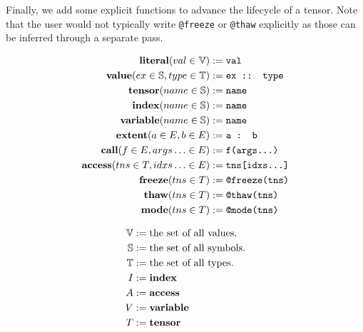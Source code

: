 Finally, we add some explicit functions to advance the lifecycle of a tensor.
Note that the user would not typically write \texttt{@freeze} or
\texttt{@thaw} explicitly as those can be inferred through a separate
pass.

\begin{figure}
\scriptsize
\noindent %
\begin{minipage}{0.4\linewidth}
\begin{align*}
    \text{\textbf{literal}}(val \in \mathbb{V}) &:= \text{\texttt{val}} \\
    \text{\textbf{value}}(ex \in \mathbb{S}, type \in \mathbb{T}) &:= \text{\texttt{ex :: type}} \\
    \text{\textbf{tensor}}(name \in \mathbb{S}) &:= \text{\texttt{name}} \\
    \text{\textbf{index}}(name \in \mathbb{S}) &:= \text{\texttt{name}} \\
    \text{\textbf{variable}}(name \in \mathbb{S}) &:= \text{\texttt{name}} \\
    \text{\textbf{extent}}(a \in E, b \in E) &:= \text{\texttt{a : b}} \\
    \text{\textbf{call}}(f \in E, args\ldots \in E) &:= \text{\texttt{f(args...)}} \\
    \text{\textbf{access}}(tns \in T, idxs\ldots \in E) &:= \text{\texttt{tns[idxs...]}} \\
    \text{\textbf{freeze}}(tns \in T) &:= \text{\texttt{@freeze(tns)}} \\
    \text{\textbf{thaw}}(tns \in T) &:= \text{\texttt{@thaw(tns)}} \\
    \text{\textbf{mode}}(tns \in T) &:= \text{\texttt{@mode(tns)}} \\
\end{align*}
\end{minipage}%
\begin{minipage}{0.5\linewidth}
\begin{align*}
    \mathbb{V} &:= \text{the set of all values.} \\
    \mathbb{S} &:= \text{the set of all symbols.} \\
    \mathbb{T} &:= \text{the set of all types.} \\
    I &:= \finchindex \\
    A &:= \finchaccess \\
    V &:= \finchvar \\
    T &:= \finchtensor \\

\end{align*}
\end{minipage}
\end{figure}

